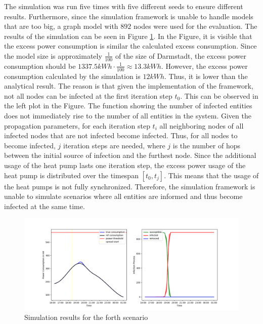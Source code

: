 The simulation was run five times with five 
different seeds to ensure different results. 
Furthermore, since the simulation framework is unable
to handle models that are too big, a graph model with 
$892$ nodes were used for the evaluation. 
The results of the simulation can be seen in 
Figure \ref{warningmessagesimulations}.
In the Figure, it is visible that the excess power 
consumption is similar the calculated excess
consumption. Since the model size is approximately
$\frac{1}{100}$ of the size of Darmstadt, the 
excess power consumption should be
$1337.5 kWh\cdot \frac{1}{100} \approx 13.3 kWh $.
However, the excess power consumption 
calculated by the simulation is $12 kWh$.
Thus, it is lower than the analytical result.
The reason is that given the implementation of the 
framework, not all nodes can be infected at the first
iteration step $t_0$. This can be observed in the 
left plot in the Figure. The function showing the 
number of infected entities does not immediately
rise to the number of all entities in the system.
Given the propagation 
parameters, for each iteration step $t_{i}$ all
neighboring nodes of all infected nodes that
are not infected become infected. Thus, for 
all nodes to become infected, $j$ iteration steps 
are needed, where $j$ is the number of hops between 
the initial source of infection and the furthest 
node. Since the additional usage of the heat pump 
lasts one iteration step, the excess power usage
of the heat pump is distributed over 
the timespan $[t_0, t_j]$. 
This means that the 
usage of the heat pumps is not fully synchronized.
Therefore, the simulation framework is unable
to simulate scenarios where all entities 
are informed and thus become infected at the 
same time. 


\begin{figure}[!ht]
    \center
    \includegraphics[scale=.53]{figs/eval/scenario4/basic_plot.png}
    \caption{Simulation results for the forth scenario}
    \label{warningmessagesimulations}
\end{figure}

